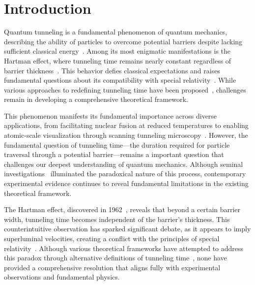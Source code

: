 \documentclass[%
 reprint,
 amsmath,amssymb,
 aps,
]{revtex4-1}
\numberwithin{equation}{section}%
\begin{document}
\section{Introduction}
\label{sec:Introduction}

Quantum tunneling is a fundamental phenomenon of quantum mechanics, describing the ability of particles to overcome potential barriers despite lacking sufficient classical energy~\cite{griffiths2018, cohen2019}. Among its most enigmatic manifestations is the Hartman effect, where tunneling time remains nearly constant regardless of barrier thickness~\cite{hartman1962}. This behavior defies classical expectations and raises fundamental questions about its compatibility with special relativity~\cite{winful2006, buttiker1983}. While various approaches to redefining tunneling time have been proposed~\cite{buttiker1982, landauer1989}, challenges remain in developing a comprehensive theoretical framework.

This phenomenon manifests its fundamental importance across diverse applications, from facilitating nuclear fusion at reduced temperatures to enabling atomic-scale visualization through scanning tunneling microscopy~\cite{razavy2003, eigler1990}. However, the fundamental question of tunneling time—the duration required for particle traversal through a potential barrier—remains a important question that challenges our deepest understanding of quantum mechanics. Although seminal investigations~\cite{maccoll1932, hauge1989} illuminated the paradoxical nature of this process, contemporary experimental evidence continues to reveal fundamental limitations in the existing theoretical framework.

The Hartman effect, discovered in 1962~\cite{hartman1962}, reveals that beyond a certain barrier width, tunneling time becomes independent of the barrier’s thickness. This counterintuitive observation has sparked significant debate, as it appears to imply superluminal velocities, creating a conflict with the principles of special relativity~\cite{winful2006, buttiker1983}. Although various theoretical frameworks have attempted to address this paradox through alternative definitions of tunneling time~\cite{buttiker1982, landauer1989}, none have provided a comprehensive resolution that aligns fully with experimental observations and fundamental physics.
\end{document}
